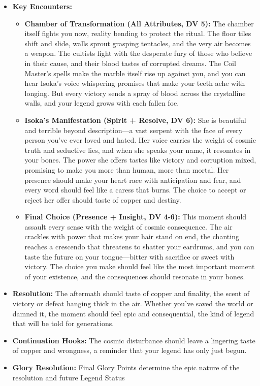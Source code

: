\documentclass[11pt]{article}
\begin{document}
\begin{itemize}
\begin{itemize}
  \end{itemize}
\item \textbf{Key Encounters:}
  \begin{itemize}
  \item \textbf{Chamber of Transformation (All Attributes, DV 5):} The chamber itself fights you now, reality bending to protect the ritual. The floor tiles shift and slide, walls sprout grasping tentacles, and the very air becomes a weapon. The cultists fight with the desperate fury of those who believe in their cause, and their blood tastes of corrupted dreams. The Coil Master's spells make the marble itself rise up against you, and you can hear Isoka's voice whispering promises that make your teeth ache with longing. But every victory sends a spray of blood across the crystalline walls, and your legend grows with each fallen foe.
  \item \textbf{Isoka's Manifestation (Spirit + Resolve, DV 6):} She is beautiful and terrible beyond description—a vast serpent with the face of every person you've ever loved and hated. Her voice carries the weight of cosmic truth and seductive lies, and when she speaks your name, it resonates in your bones. The power she offers tastes like victory and corruption mixed, promising to make you more than human, more than mortal. Her presence should make your heart race with anticipation and fear, and every word should feel like a caress that burns. The choice to accept or reject her offer should taste of copper and destiny.
  \item \textbf{Final Choice (Presence + Insight, DV 4-6):} This moment should assault every sense with the weight of cosmic consequence. The air crackles with power that makes your hair stand on end, the chanting reaches a crescendo that threatens to shatter your eardrums, and you can taste the future on your tongue—bitter with sacrifice or sweet with victory. The choice you make should feel like the most important moment of your existence, and the consequences should resonate in your bones.
  \end{itemize}
\item \textbf{Resolution:} The aftermath should taste of copper and finality, the scent of victory or defeat hanging thick in the air. Whether you've saved the world or damned it, the moment should feel epic and consequential, the kind of legend that will be told for generations.
\item \textbf{Continuation Hooks:} The cosmic disturbance should leave a lingering taste of copper and wrongness, a reminder that your legend has only just begun.
\item \textbf{Glory Resolution:} Final Glory Points determine the epic nature of the resolution and future Legend Status
\end{itemize}
\end{document}
